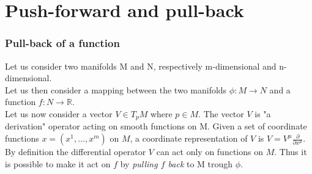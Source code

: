\documentclass{article}
\begin{document}
\section*{Push-forward and pull-back}

\subsubsection*{Pull-back of a function}
\begin{figure}[h]
    \centering
\end{figure}
Let us consider two manifolds M and N, respectively m-dimensional and n-dimensional. \\
Let us then consider a mapping between the two manifolds $\phi : M \to N$ and a function $f: N \to \mathbb{R}$. \\
Let us now consider a vector $V \in T_pM$ where $p \in M$. The vector $V$ is "a derivation" operator acting on smooth functions on M. Given a set of coordinate functions $x = (x^1, \dots, x^m)$ on $M$, a coordinate representation
of $V$ is $V = V^{\mu} \frac{\partial}{\partial x^\mu}$. \\
By definition the differential operator $V$ can act only on functions on $M$. Thus it is possible to make it act on $f$ by \emph{pulling $f$ back} to M trough $\phi$. \\
\end{document}

